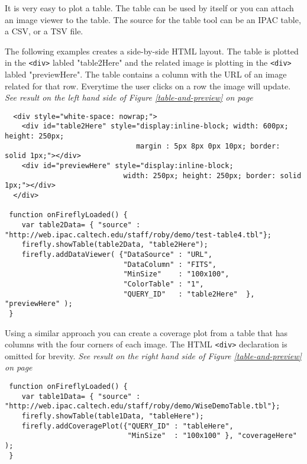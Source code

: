 \documentclass[11pt,twoside]{article}
\begin{document}
It is very easy to plot a table. The table can be used by itself or you can attach an image viewer to the table.
The source for the table tool can be an IPAC table, a CSV, or a TSV file. 

The following examples creates a side-by-side HTML layout.  The table is plotted in the \scriptsize\texttt{<div>}
\normalsize labled "table2Here"
and the related image is plotting in the \scriptsize\texttt{<div>} \normalsize labled "previewHere".
The table contains a column with the URL of an image related for that row.  
Everytime the user clicks on a row the image will update.
\small
\textit{See result on the left hand side of Figure \ref{table-and-preview} on page~\pageref{table-and-preview}}
\normalsize

\scriptsize
\begin{verbatim}
  <div style="white-space: nowrap;">
    <div id="table2Here" style="display:inline-block; width: 600px; height: 250px; 
                               margin : 5px 8px 0px 10px; border: solid 1px;"></div>
    <div id="previewHere" style="display:inline-block;
                            width: 250px; height: 250px; border: solid 1px;"></div>
  </div>

 function onFireflyLoaded() {
    var table2Data= { "source" : "http://web.ipac.caltech.edu/staff/roby/demo/test-table4.tbl"};
    firefly.showTable(table2Data, "table2Here");
    firefly.addDataViewer( {"DataSource" : "URL",
                            "DataColumn" : "FITS",
                            "MinSize"    : "100x100",
                            "ColorTable" : "1",
                            "QUERY_ID"   : "table2Here"  }, "previewHere" );
 }
\end{verbatim}
\normalsize


Using a similar approach you can create a coverage plot from a table that has columns 
with the four corners of each image.
The HTML \scriptsize\texttt{<div>} \normalsize declaration is omitted for brevity. 
\small
\textit{See result on the right hand side of Figure \ref{table-and-preview} on page~\pageref{table-and-preview}}
\normalsize

\scriptsize
\begin{verbatim}
 function onFireflyLoaded() {
    var table1Data= { "source" : "http://web.ipac.caltech.edu/staff/roby/demo/WiseDemoTable.tbl"};
    firefly.showTable(table1Data, "tableHere");
    firefly.addCoveragePlot({"QUERY_ID" : "tableHere",
                             "MinSize"  : "100x100" }, "coverageHere" );
 }
\end{verbatim}
\normalsize
\end{document}
